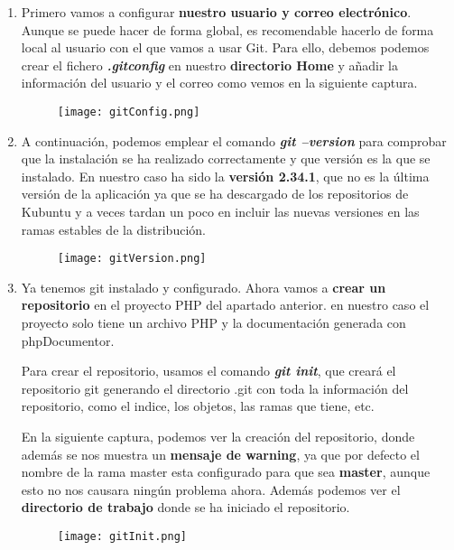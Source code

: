 \begin{enumerate}
    \item Primero vamos a configurar \textbf{nuestro usuario y correo electrónico}. Aunque se puede hacer de forma global, es recomendable hacerlo de forma local al usuario con el que vamos a usar Git. Para ello, debemos podemos crear el fichero \textbf{\textit{.gitconfig}} en nuestro \textbf{directorio Home} y añadir la información del usuario y el correo como vemos en la siguiente captura.

    \begin{figure}[H]
        \centering
        \texttt{[image: gitConfig.png]}
    \end{figure}

    \item A continuación, podemos emplear el comando \textbf{\textit{git --version}} para comprobar que la instalación se ha realizado correctamente y que versión es la que se instalado. En nuestro caso ha sido la \textbf{versión 2.34.1}, que no es la última versión de la aplicación ya que se ha descargado de los repositorios de Kubuntu y a veces tardan un poco en incluir las nuevas versiones en las ramas estables de la distribución.

    \begin{figure}[H]
        \centering
        \texttt{[image: gitVersion.png]}
    \end{figure}

    \item Ya tenemos git instalado y configurado. Ahora vamos a \textbf{crear un repositorio} en el proyecto PHP del apartado anterior. en nuestro caso el proyecto solo tiene un archivo PHP y la documentación generada con phpDocumentor.

    Para crear el repositorio, usamos el comando \textbf{\textit{git init}}, que creará el repositorio git generando el directorio .git con toda la información del repositorio, como el indice, los objetos, las ramas que tiene, etc.

    En la siguiente captura, podemos ver la creación del repositorio, donde además se nos muestra un \textbf{mensaje de warning}, ya que por defecto el nombre de la rama master esta configurado para que sea \textbf{master}, aunque esto no nos causara ningún problema ahora. Además podemos ver el \textbf{directorio de trabajo} donde se ha iniciado el repositorio.

    \begin{figure}[H]
        \centering
        \texttt{[image: gitInit.png]}
    \end{figure}
\end{enumerate}

